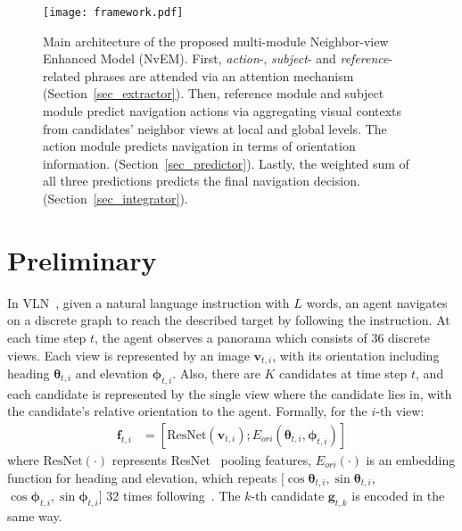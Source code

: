 \documentclass[sigconf]{acmart}
\begin{document}
\begin{figure*}[!htbp]
	\centering
	\texttt{[image: framework.pdf]}
	\vspace{-6mm}
	\caption{Main architecture of the proposed multi-module Neighbor-view Enhanced Model (NvEM).
First, \textit{action}-, \textit{subject}- and \textit{reference}-related phrases are attended via an attention mechanism (Section~\ref{sec_extractor}). 
Then, reference module and subject module predict navigation actions via aggregating visual contexts from candidates' neighbor views at local and global levels. The action module predicts navigation in terms of orientation information. (Section~\ref{sec_predictor}). 
Lastly, the weighted sum of all three predictions predicts the final navigation decision. (Section~\ref{sec_integrator}).}
	\label{fig_framework}
\end{figure*}
\section{Preliminary}
In VLN~\cite{anderson2018vln}, given a natural language instruction with $L$ words, an agent navigates on a discrete graph to reach the described target by following the instruction. 
At each time step $t$, the agent observes a panorama which consists of 36 discrete views. 
Each view is represented by an image $\mathbf{v}_{t,i}$, with its orientation including heading $\mathbf{\theta}_{t,i}$ and elevation $\mathbf{\phi}_{t,i}$. 
Also, there are $K$ candidates at time step $t$, and each candidate is represented by the single view where the candidate lies in, with the candidate's relative orientation to the agent. Formally, for the $i$-th view:
\begin{equation}
	\begin{aligned}\label{form_angle}
		\mathbf{f}_{t,i}&=[\textrm{ResNet}(\mathbf{v}_{t,i}); E_{ori}(\mathbf{\theta}_{t,i}, \mathbf{\phi}_{t,i})]
	\end{aligned}
\end{equation}
where $\textrm{ResNet}(\cdot)$ represents ResNet~\cite{he2016resnet} pooling features, $E_{ori}(\cdot)$ is an embedding function for heading and elevation, which repeats $[\cos \mathbf{\theta}_{t,i},\sin \mathbf{\theta}_{t,i}$, $\cos\mathbf{\phi}_{t,i},\sin\mathbf{\phi}_{t,i}]$ 32 times following~\cite{tan2019envdrop}. The $k$-th candidate $\mathbf{g}_{t,k}$ is encoded in the same way.
\end{document}
